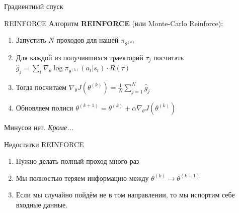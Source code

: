 \documentclass[aspectratio=169,12pt,t,compress]{beamer}
\begin{document}
\begin{frame}{Градиентный спуск}
\end{frame}

\begin{frame}{REINFORCE}
	Алгоритм \textbf{REINFORCE} (или Monte-Carlo Reinforce):
	\begin{enumerate}
		\item Запустить $N$ проходов для нашей $\pi _{\theta ^{(k)}}$
		\item Для каждой из получившихся траекторий $\tau_{j}$ посчитать $\hat{g}_{j} = \sum\limits_{t} \nabla_{\theta }\log \pi_{\theta ^{(k)}}(a_{t}|s_{t})\cdot R(\tau)$
		\item Тогда посчитаем $\nabla_{\theta}J(\theta ^{(k)}) = \frac{1}{N} \sum\limits_{j=1}^N \hat{g}_{j}$
		\item Обновляем полиси $\theta ^{(k+1)} = \theta ^{(k)} + \alpha \nabla_{\theta}J(\theta ^{(k)})$
	\end{enumerate}

	Минусов нет. \textit{Кроме...}
\end{frame}

\begin{frame}{Недостатки REINFORCE}
	\begin{enumerate}
		\item Нужно делать полный проход много раз
		\item Мы полностью теряем информацию между $\theta ^{(k)}\to \theta ^{(k+1)}$
		\item Если мы случайно пойдём не в том направлении, то мы испортим себе входные данные.
	\end{enumerate}
\end{frame}
\end{document}
